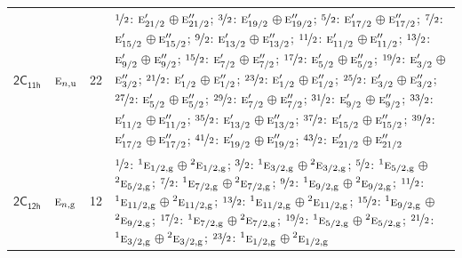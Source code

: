 \documentclass[10pt,a4paper]{article}
\numberwithin{equation}{section}
\newcommand{\grp}[1]{\mathsf{#1}}
\newcommand{\irr}[1]{\text{\normalfont\scshape #1}}
\newcommand{\conjpair}[1]{{}^{#1}}
\newcommand{\ptag}[1]{\mathrm{#1}}
\newlength{\fillwidth}\newlength{\cellwidth}\newlength{\colwidth}
\begin{document}
{\begin{longtable}{@{}llr>{\RaggedRight\arraybackslash}p{\fillwidth}@{}}
\href{2C11h.pdf}{$\grp{2C_{11h}}$} & $\irr{e}_{n,\ptag{u}}$ & 22 & $\nicefrac{1}{2}$: $\irr{e}_{21/2}'$${}\oplus{}$$\irr{e}_{21/2}''$; $\nicefrac{3}{2}$: $\irr{e}_{19/2}'$${}\oplus{}$$\irr{e}_{19/2}''$; $\nicefrac{5}{2}$: $\irr{e}_{17/2}'$${}\oplus{}$$\irr{e}_{17/2}''$; $\nicefrac{7}{2}$: $\irr{e}_{15/2}'$${}\oplus{}$$\irr{e}_{15/2}''$; $\nicefrac{9}{2}$: $\irr{e}_{13/2}'$${}\oplus{}$$\irr{e}_{13/2}''$; $\nicefrac{11}{2}$: $\irr{e}_{11/2}'$${}\oplus{}$$\irr{e}_{11/2}''$; $\nicefrac{13}{2}$: $\irr{e}_{9/2}'$${}\oplus{}$$\irr{e}_{9/2}''$; $\nicefrac{15}{2}$: $\irr{e}_{7/2}'$${}\oplus{}$$\irr{e}_{7/2}''$; $\nicefrac{17}{2}$: $\irr{e}_{5/2}'$${}\oplus{}$$\irr{e}_{5/2}''$; $\nicefrac{19}{2}$: $\irr{e}_{3/2}'$${}\oplus{}$$\irr{e}_{3/2}''$; $\nicefrac{21}{2}$: $\irr{e}_{1/2}'$${}\oplus{}$$\irr{e}_{1/2}''$; $\nicefrac{23}{2}$: $\irr{e}_{1/2}'$${}\oplus{}$$\irr{e}_{1/2}''$; $\nicefrac{25}{2}$: $\irr{e}_{3/2}'$${}\oplus{}$$\irr{e}_{3/2}''$; $\nicefrac{27}{2}$: $\irr{e}_{5/2}'$${}\oplus{}$$\irr{e}_{5/2}''$; $\nicefrac{29}{2}$: $\irr{e}_{7/2}'$${}\oplus{}$$\irr{e}_{7/2}''$; $\nicefrac{31}{2}$: $\irr{e}_{9/2}'$${}\oplus{}$$\irr{e}_{9/2}''$; $\nicefrac{33}{2}$: $\irr{e}_{11/2}'$${}\oplus{}$$\irr{e}_{11/2}''$; $\nicefrac{35}{2}$: $\irr{e}_{13/2}'$${}\oplus{}$$\irr{e}_{13/2}''$; $\nicefrac{37}{2}$: $\irr{e}_{15/2}'$${}\oplus{}$$\irr{e}_{15/2}''$; $\nicefrac{39}{2}$: $\irr{e}_{17/2}'$${}\oplus{}$$\irr{e}_{17/2}''$; $\nicefrac{41}{2}$: $\irr{e}_{19/2}'$${}\oplus{}$$\irr{e}_{19/2}''$; $\nicefrac{43}{2}$: $\irr{e}_{21/2}'$${}\oplus{}$$\irr{e}_{21/2}''$\\
\href{2C12h.pdf}{$\grp{2C_{12h}}$} & $\irr{e}_{n,\ptag{g}}$ & 12 & $\nicefrac{1}{2}$: $\conjpair{1}\irr{e}_{1/2,\ptag{g}}$${}\oplus{}$$\conjpair{2}\irr{e}_{1/2,\ptag{g}}$; $\nicefrac{3}{2}$: $\conjpair{1}\irr{e}_{3/2,\ptag{g}}$${}\oplus{}$$\conjpair{2}\irr{e}_{3/2,\ptag{g}}$; $\nicefrac{5}{2}$: $\conjpair{1}\irr{e}_{5/2,\ptag{g}}$${}\oplus{}$$\conjpair{2}\irr{e}_{5/2,\ptag{g}}$; $\nicefrac{7}{2}$: $\conjpair{1}\irr{e}_{7/2,\ptag{g}}$${}\oplus{}$$\conjpair{2}\irr{e}_{7/2,\ptag{g}}$; $\nicefrac{9}{2}$: $\conjpair{1}\irr{e}_{9/2,\ptag{g}}$${}\oplus{}$$\conjpair{2}\irr{e}_{9/2,\ptag{g}}$; $\nicefrac{11}{2}$: $\conjpair{1}\irr{e}_{11/2,\ptag{g}}$${}\oplus{}$$\conjpair{2}\irr{e}_{11/2,\ptag{g}}$; $\nicefrac{13}{2}$: $\conjpair{1}\irr{e}_{11/2,\ptag{g}}$${}\oplus{}$$\conjpair{2}\irr{e}_{11/2,\ptag{g}}$; $\nicefrac{15}{2}$: $\conjpair{1}\irr{e}_{9/2,\ptag{g}}$${}\oplus{}$$\conjpair{2}\irr{e}_{9/2,\ptag{g}}$; $\nicefrac{17}{2}$: $\conjpair{1}\irr{e}_{7/2,\ptag{g}}$${}\oplus{}$$\conjpair{2}\irr{e}_{7/2,\ptag{g}}$; $\nicefrac{19}{2}$: $\conjpair{1}\irr{e}_{5/2,\ptag{g}}$${}\oplus{}$$\conjpair{2}\irr{e}_{5/2,\ptag{g}}$; $\nicefrac{21}{2}$: $\conjpair{1}\irr{e}_{3/2,\ptag{g}}$${}\oplus{}$$\conjpair{2}\irr{e}_{3/2,\ptag{g}}$; $\nicefrac{23}{2}$: $\conjpair{1}\irr{e}_{1/2,\ptag{g}}$${}\oplus{}$$\conjpair{2}\irr{e}_{1/2,\ptag{g}}$\\

\end{longtable}}
\end{document}
